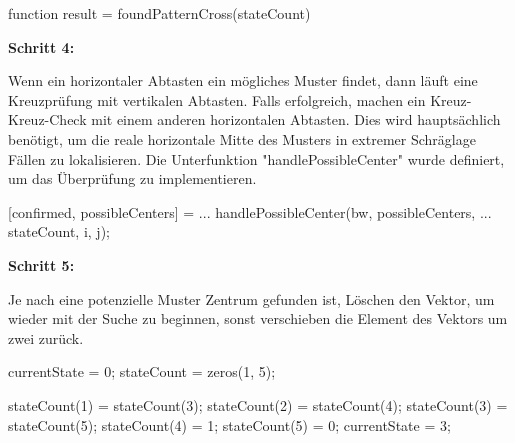 \singlespacing
\begin{matlab}[firstnumber=1, name=MATLABCodeBeispiel, caption={MATLAB Code Beispiel}, label={lst:MATLABCodeBeispiel}]

function result = foundPatternCross(stateCount)

\end{matlab}
\onehalfspacing                       

\textbf{Schritt 4:}

Wenn ein horizontaler Abtasten ein mögliches Muster findet, dann läuft eine Kreuzprüfung mit vertikalen Abtasten. Falls erfolgreich, machen ein Kreuz-Kreuz-Check mit einem anderen horizontalen Abtasten. Dies wird hauptsächlich benötigt, um die reale horizontale Mitte des Musters in  extremer Schräglage Fällen zu lokalisieren. Die Unterfunktion "handlePossibleCenter" wurde definiert, um das  Überprüfung zu implementieren.

\singlespacing
\begin{matlab}[firstnumber=1, name=MATLABCodeBeispiel, caption={MATLAB Code Beispiel}, label={lst:MATLABCodeBeispiel}]

   [confirmed, possibleCenters] = ...
                            handlePossibleCenter(bw, possibleCenters, ...
                            stateCount, i, j);

\end{matlab}
\onehalfspacing

\textbf{Schritt 5:}

Je nach eine potenzielle Muster Zentrum gefunden ist, Löschen den Vektor, um wieder mit der Suche zu beginnen, sonst verschieben die Element des Vektors um zwei zurück.

\singlespacing
\begin{matlab}[firstnumber=1, name=MATLABCodeBeispiel, caption={MATLAB Code Beispiel}, label={lst:MATLABCodeBeispiel}]
                        currentState = 0;
                        stateCount = zeros(1, 5);
                        
                        stateCount(1) = stateCount(3);
                        stateCount(2) = stateCount(4);
                        stateCount(3) = stateCount(5);
                        stateCount(4) = 1;
                        stateCount(5) = 0;
                        currentState = 3;

\end{matlab}
\onehalfspacing  
                       


